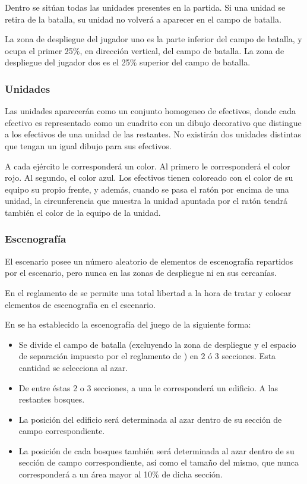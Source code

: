 Dentro se sitúan todas las unidades presentes en la partida. Si una
unidad se retira de la batalla, su unidad no volverá a aparecer en el
campo de batalla.

La zona de despliegue del jugador uno es la parte inferior del campo
de batalla, y ocupa el primer 25\%, en dirección vertical, del campo
de batalla. La zona de despliegue del jugador dos es el 25\% superior
del campo de batalla.

\subsubsection*{Unidades}
Las unidades aparecerán como un conjunto homogeneo de efectivos, donde
cada efectivo es representado como un cuadrito con un dibujo
decorativo que distingue a los efectivos de una unidad de las
restantes. No existirán dos unidades distintas que tengan un igual
dibujo para sus efectivos.

A cada ejército le corresponderá un color. Al primero le corresponderá
el color rojo. Al segundo, el color azul. Los efectivos tienen
coloreado con el color de su equipo su propio frente, y además, cuando
se pasa el ratón por encima de una unidad, la circunferencia que
muestra la unidad apuntada por el ratón tendrá también el color de la
equipo de la unidad.

\subsubsection*{Escenografía}
El escenario posee un número aleatorio de elementos de escenografía
repartidos por el escenario, pero nunca en las zonas de despliegue ni
en sus cercanías.

En el reglamento de \gom se permite una total libertad a la hora de
tratar y colocar elementos de escenografía en el escenario.

En \gom se ha establecido la escenografía del juego de la siguiente
forma:
\begin{itemize}
\item Se divide el campo de batalla (excluyendo la zona de despliegue
  y el espacio de separación impuesto por el reglamento de \gomf) en 2
  ó 3 secciones. Esta cantidad se selecciona al azar.
\item De entre éstas 2 o 3 secciones, a una le corresponderá un
  edificio. A las restantes bosques.
\item La posición del edificio será determinada al azar dentro de su
  sección de campo correspondiente.
\item La posición de cada bosques también será determinada al azar
  dentro de su sección de campo correspondiente, así como el tamaño
  del mismo, que nunca corresponderá a un área mayor al 10\% de dicha
  sección.
\end{itemize}

